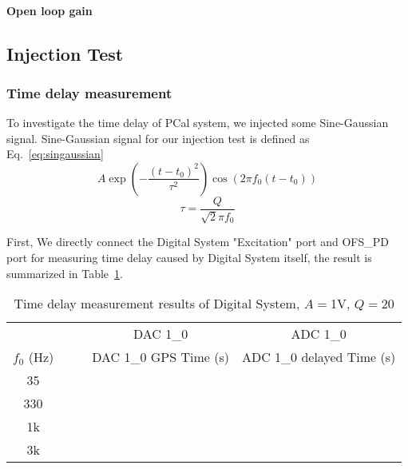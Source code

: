 \paragraph{Open loop gain}


\pagebreak

\subsection{Injection Test}
\subsubsection{Time delay measurement}

To investigate the time delay of PCal system, we injected some Sine-Gaussian signal.
 Sine-Gaussian signal for our injection test is defined as Eq.~\ref{eq:singaussian}
\begin{equation}
\label{eq:singaussian}
    A \exp\left(-\frac{(t-t_0)^2}{\tau^2}\right) \cos ( 2 \pi f_0 (t-t_0))
\end{equation}
\begin{equation*}
   \tau = \frac{Q}{ \sqrt{2} \pi f_0}
\end{equation*}



\noindent
First, We directly connect the Digital System "Excitation" port and OFS\_PD port for measuring time delay caused by Digital System itself, the result is summarized in Table~\ref{tab:timedelayDGS}.
\begin{table}[htbp]
   \centering
   \begin{tabular}{ ccrcc } %
      \toprule
                 &    &  & DAC 1\_0              & ADC 1\_0  \\

     \cmidrule(r){3-5} %
      $f_0$ (Hz) &    &  & DAC 1\_0 GPS Time (s) & ADC 1\_0 delayed Time (s) \\
      \midrule
        35  &    &    &   &\\
        330 &    &    &   &\\
        1k  &    &    &   &\\
        3k  &    &    &   &\\
      \bottomrule
   \end{tabular}
   \caption{Time delay measurement results of Digital System, $A=$1V, $Q=$20 }
   \label{tab:timedelayDGS}
\end{table}

